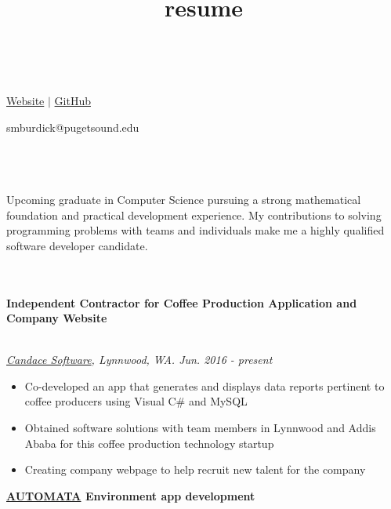 \documentclass[11pt]{article}
\title{resume}
\newcommand\phv{\fontfamily{phv}\selectfont}
\begin{document}
\centerline{{\Huge \bf \phv{Sam Burdick}}}    %
\noindent\\
\centerline{
{\textcolor{blue}{\href{https://smburdick.github.io/}{Website}} \hspace{1.5pt} $|$ \hspace{1.5pt}
\textcolor{blue}{\href{https://github.com/smburdick}{GitHub}}
}}
\centerline{{smburdick@pugetsound.edu}}
\\\\
\noindent {\LARGE \bf \phv{Summary}}   %
\medskip\\
\noindent
Upcoming graduate in Computer Science pursuing a strong mathematical foundation and practical development experience. My contributions to solving programming problems with teams and individuals make me a highly qualified software developer candidate. \\\\
\smallskip
\noindent{\LARGE \bf \phv{Work Experience} }  \medskip\\
\noindent \centerline{\large \bf Independent Contractor for Coffee Production Application and Company Website \hfill }
\\
\emph{ {\textcolor{blue}{\href{http://candacesoft.com}{Candace Software}}, Lynnwood, WA. Jun. 2016 - present}}
\begin{itemize}
  \item Co-developed an app that generates and displays data reports pertinent to coffee producers using Visual C\# and MySQL
  \item Obtained software solutions with team members in Lynnwood and Addis Ababa for this coffee production technology startup
  \item Creating company webpage to help recruit new talent for the company
\end{itemize}
\noindent \centerline{\large \bf {\textcolor{blue}{\href{https://tmfsa.herokuapp.com/}{AUTOMATA}} Environment app development \hfill  }}
\end{document}
